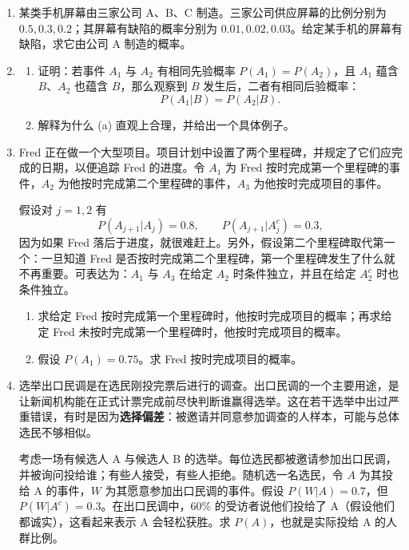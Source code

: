 \documentclass[UTF8,12pt,a4paper,fontset=fandol]{ctexart}
\begin{document}
\begin{enumerate}
  \item 某类手机屏幕由三家公司 A、B、C 制造。三家公司供应屏幕的比例分别为 $0.5,0.3,0.2$；其屏幕有缺陷的概率分别为 $0.01,0.02,0.03$。给定某手机的屏幕有缺陷，求它由公司 A 制造的概率。

  \item
  \begin{enumerate}
    \item 证明：若事件 $A_1$ 与 $A_2$ 有相同先验概率 $P(A_1)=P(A_2)$，且 $A_1$ 蕴含 $B$、$A_2$ 也蕴含 $B$，那么观察到 $B$ 发生后，二者有相同后验概率：
    \[
      P(A_1|B)=P(A_2|B).
    \]
    \item 解释为什么 (a) 直观上合理，并给出一个具体例子。
  \end{enumerate}

  \item Fred 正在做一个大型项目。项目计划中设置了两个里程碑，并规定了它们应完成的日期，以便追踪 Fred 的进度。令 $A_1$ 为 Fred 按时完成第一个里程碑的事件，$A_2$ 为他按时完成第二个里程碑的事件，$A_3$ 为他按时完成项目的事件。

  假设对 $j=1,2$ 有
  \[
    P(A_{j+1}|A_j)=0.8,\qquad P(A_{j+1}|A_j^c)=0.3,
  \]
  因为如果 Fred 落后于进度，就很难赶上。另外，假设第二个里程碑取代第一个：一旦知道 Fred 是否按时完成第二个里程碑，第一个里程碑发生了什么就不再重要。可表达为：$A_1$ 与 $A_3$ 在给定 $A_2$ 时条件独立，并且在给定 $A_2^c$ 时也条件独立。
  \begin{enumerate}
    \item 求给定 Fred 按时完成第一个里程碑时，他按时完成项目的概率；再求给定 Fred 未按时完成第一个里程碑时，他按时完成项目的概率。
    \item 假设 $P(A_1)=0.75$。求 Fred 按时完成项目的概率。
  \end{enumerate}

  \item 选举出口民调是在选民刚投完票后进行的调查。出口民调的一个主要用途，是让新闻机构能在正式计票完成前尽快判断谁赢得选举。这在若干选举中出过严重错误，有时是因为\textbf{选择偏差}：被邀请并同意参加调查的人样本，可能与总体选民不够相似。

  考虑一场有候选人 A 与候选人 B 的选举。每位选民都被邀请参加出口民调，并被询问投给谁；有些人接受，有些人拒绝。随机选一名选民，令 $A$ 为其投给 A 的事件，$W$ 为其愿意参加出口民调的事件。假设 $P(W|A)=0.7$，但 $P(W|A^c)=0.3$。在出口民调中，$60\%$ 的受访者说他们投给了 A（假设他们都诚实），这看起来表示 A 会轻松获胜。求 $P(A)$，也就是实际投给 A 的人群比例。


\end{enumerate}
\end{document}
